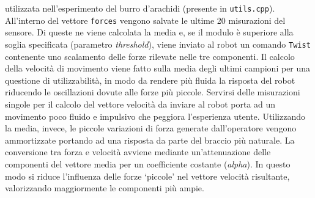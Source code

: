 utilizzata nell'esperimento del burro d'arachidi (presente in \verb|utils.cpp|).  
All'interno del vettore \verb|forces| vengono salvate le ultime 20 misurazioni del sensore. Di queste ne viene calcolata la media 
e, se il modulo \`{e} superiore alla soglia specificata (parametro \textit{threshold}), viene inviato al robot un comando 
\verb|Twist| contenente uno scalamento delle 
forze rilevate nelle tre componenti. Il calcolo della velocit\`{a} di movimento viene fatto sulla media degli ultimi campioni 
per una questione di utilizzabilit\`{a}, in modo da rendere pi\`{u} fluida la risposta del robot riducendo le oscillazioni dovute 
alle forze pi\`{u} piccole. Servirsi delle misurazioni singole 
per il calcolo del vettore velocit\`{a} da inviare al robot 
porta ad un movimento poco fluido e impulsivo che peggiora l'esperienza utente. 
Utilizzando la media, invece, le piccole variazioni 
di forza generate dall'operatore vengono ammortizzate portando ad una risposta da parte del braccio pi\`{u} naturale.
La conversione tra forza e velocit\`{a} avviene mediante un'attenuazione delle componenti del vettore media per un coefficiente 
costante (\textit{alpha}). In questo modo si riduce l'influenza delle forze `piccole' nel vettore velocit\`{a} risultante, valorizzando maggiormente le 
componenti pi\`{u} ampie. 